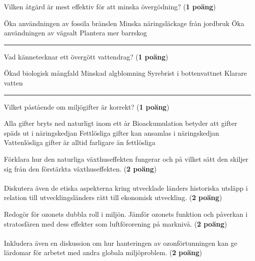 \documentclass{exam}
\begin{document}
\begin{questions}
\break
\vspace{5mm} 
\question Vilken åtgärd är mest effektiv för att minska övergödning? (\textbf{1 poäng})
\begin{checkboxes}
    \choice Öka användningen av fossila bränslen
    \CorrectChoice Minska näringsläckage från jordbruk
    \choice Öka användningen av vägsalt
    \choice Plantera mer barrskog
\end{checkboxes}

\vspace{5mm} 
\hrule 
\vspace{5mm} 

\question Vad kännetecknar ett övergött vattendrag? (\textbf{1 poäng})
\begin{checkboxes}
    \choice Ökad biologisk mångfald
    \choice Minskad algblomning
    \CorrectChoice Syrebrist i bottenvattnet
    \choice Klarare vatten
\end{checkboxes}

\vspace{5mm} 
\hrule 
\vspace{5mm} 

\question Vilket påstående om miljögifter är korrekt? (\textbf{1 poäng})
\begin{checkboxes}
    \choice Alla gifter bryts ned naturligt inom ett år
    \choice Bioackumulation betyder att gifter späds ut i näringskedjan
    \CorrectChoice Fettlösliga gifter kan ansamlas i näringskedjan
    \choice Vattenlösliga gifter är alltid farligare än fettlösliga
\end{checkboxes}

\break

\begin{center}
\end{center}

\question
Förklara hur den naturliga växthuseffekten fungerar och på vilket sätt den skiljer sig från den förstärkta växthuseffekten. (\textbf{2 poäng}) \\ 
\\ Diskutera även de etiska aspekterna kring utvecklade länders historiska utsläpp i relation till utvecklingsländers rätt till ekonomisk utveckling. (\textbf{2 poäng})
\vspace{80mm}

\question
Redogör för ozonets dubbla roll i miljön. Jämför ozonets funktion och påverkan i stratosfären med dess effekter som luftförorening på marknivå. (\textbf{2 poäng}) \\ 
\\ Inkludera även en diskussion om hur hanteringen av ozonförtunningen kan ge lärdomar för arbetet med andra globala miljöproblem. (\textbf{2 poäng})
\vspace{60mm}

\end{questions}
\end{document}
